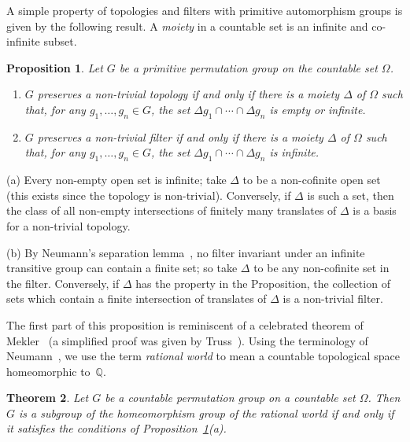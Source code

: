 \documentclass[12pt]{article}
\newtheorem{theorem}{Theorem}[section]
\newtheorem{prop}[theorem]{Proposition}
\newenvironment{proof}{\prepf\rm}{\endprepf}
\begin{document}
A simple property of topologies and filters with primitive automorphism groups
is given by the following result. A \emph{moiety} in a countable set is an
infinite and co-infinite subset.

\begin{prop}
Let $G$ be a primitive permutation group on the countable set $\Omega$.
\begin{enumerate}
\item $G$ preserves a non-trivial topology if and only if there is a moiety
$\Delta$ of $\Omega$ such that, for any $g_1,\ldots,g_n\in G$, the set
$\Delta g_1\cap\cdots\cap\Delta g_n$ is empty or infinite.
\item $G$ preserves a non-trivial filter if and only if there is a moiety
$\Delta$ of $\Omega$ such that, for any $g_1,\ldots,g_n\in G$, the set
$\Delta g_1\cap\cdots\cap\Delta g_n$ is infinite.
\end{enumerate}
\label{p:filtop}
\end{prop}

\begin{proof}
(a) Every non-empty open set is infinite; take $\Delta$ to be a non-cofinite
open set (this exists since the topology is non-trivial). Conversely, if 
$\Delta$ is such a set, then the class of all non-empty intersections of
finitely many translates of $\Delta$ is a basis for a non-trivial topology.

\medskip

(b) By Neumann's separation lemma~\cite[Lemma 2.3]{neumann}, no filter
invariant under an infinite transitive group can contain a finite set; so take
$\Delta$ to be any non-cofinite set in the filter. Conversely, if $\Delta$ has
the property in the Proposition, the collection of sets which contain a finite
intersection of translates of $\Delta$ is a non-trivial filter.
\end{proof}

The first part of this proposition is reminiscent of a celebrated theorem
of Mekler~\cite{mekler} (a simplified proof was given by Truss~\cite{truss}).
Using the terminology of Neumann~\cite{rational}, we use the term
\emph{rational world} to mean a countable topological space homeomorphic
to~$\mathbb{Q}$.

\begin{theorem}
Let $G$ be a countable permutation group on a countable set $\Omega$. Then
$G$ is a subgroup of the homeomorphism group of the rational world if and 
only if it satisfies the conditions of Proposition~\ref{p:filtop}(a).
\end{theorem}
\end{document}
